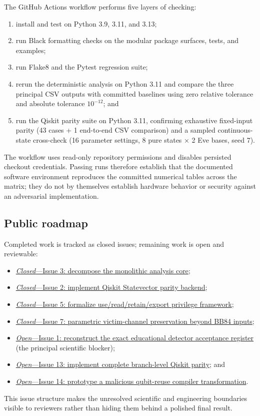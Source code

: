 The GitHub Actions workflow performs five layers of checking:
\begin{enumerate}
  \item install and test on Python 3.9, 3.11, and 3.13;
  \item run Black formatting checks on the modular package surfaces, tests, and
  examples;
  \item run Flake8 and the Pytest regression suite;
  \item rerun the deterministic analysis on Python 3.11 and compare the three
  principal CSV outputs with committed baselines using zero relative tolerance
  and absolute tolerance $10^{-12}$; and
  \item run the Qiskit parity suite on Python 3.11, confirming exhaustive
  fixed-input parity (43 cases + 1 end-to-end CSV comparison) and a sampled
  continuous-state cross-check (16 parameter settings, 8 pure states ×
  2 Eve bases, seed 7).
\end{enumerate}
The workflow uses read-only repository permissions and disables persisted
checkout credentials. Passing runs therefore establish that the documented
software environment reproduces the committed numerical tables across the
matrix; they do not by themselves establish hardware behavior or security
against an adversarial implementation.

\subsection{Public roadmap}

Completed work is tracked as closed issues; remaining work is open and
reviewable:
\begin{itemize}
  \item \href{https://github.com/redxe/quantum-reuse-security/issues/3}
  {\textit{Closed}---Issue 3: decompose the monolithic analysis core};
  \item \href{https://github.com/redxe/quantum-reuse-security/issues/2}
  {\textit{Closed}---Issue 2: implement Qiskit Statevector parity backend};
  \item \href{https://github.com/redxe/quantum-reuse-security/issues/5}
  {\textit{Closed}---Issue 5: formalize use/read/retain/export privilege
  framework};
  \item \href{https://github.com/redxe/quantum-reuse-security/issues/7}
  {\textit{Closed}---Issue 7: parametric victim-channel preservation beyond
  BB84 inputs};
  \item \href{https://github.com/redxe/quantum-reuse-security/issues/1}
  {\textit{Open}---Issue 1: reconstruct the exact educational detector acceptance
  register} (the principal scientific blocker);
  \item \href{https://github.com/redxe/quantum-reuse-security/issues/13}
  {\textit{Open}---Issue 13: implement complete branch-level Qiskit parity}; and
  \item \href{https://github.com/redxe/quantum-reuse-security/issues/14}
  {\textit{Open}---Issue 14: prototype a malicious qubit-reuse compiler
  transformation}.
\end{itemize}
This issue structure makes the unresolved scientific and engineering boundaries
visible to reviewers rather than hiding them behind a polished final result.
